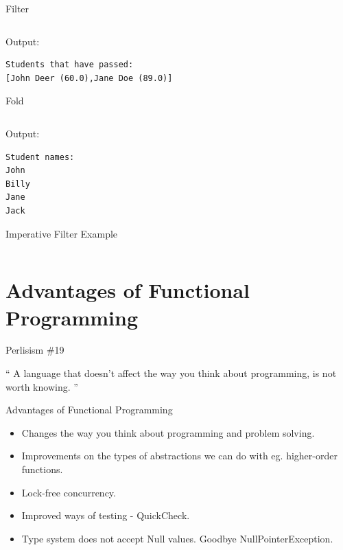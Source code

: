 \documentclass{beamer}
\begin{document}
\begin{frame}[fragile]{Filter}

  \inputminted[firstline=8,lastline=12]{haskell}{code/studentfilter.hs}

  \vskip5mm

Output:
  \begin{verbatim}
Students that have passed:
[John Deer (60.0),Jane Doe (89.0)]
  \end{verbatim}

\end{frame}


\begin{frame}[fragile]{Fold}

  \inputminted[firstline=10,lastline=13]{haskell}{code/studentfold.hs}

  \vskip5mm

Output:
  \begin{verbatim}
Student names:
John
Billy
Jane
Jack
  \end{verbatim}

\end{frame}


\begin{frame}{Imperative Filter Example}

  \inputminted[firstline=3,lastline=17]{python}{code/studentfilter.py}

\end{frame}

\section{Advantages of Functional Programming}

\begin{frame}{Perlisism \#19}

\begin{exampleblock}{}
  {\Large ``
    A language that doesn't affect the way you think about programming, is not worth knowing.
  ''}
  \vskip5mm
  \hspace*{}
\end{exampleblock}

\end{frame}

\begin{frame}{Advantages of Functional Programming}

  \begin{itemize}[<+->]
  \item Changes the way you think about programming and problem solving.
  \item Improvements on the types of abstractions we can do with eg.
    higher-order functions.
  \item Lock-free concurrency.
  \item Improved ways of testing - QuickCheck.
  \item Type system does not accept Null values. Goodbye NullPointerException.
  \end{itemize}

\end{frame}
\end{document}
